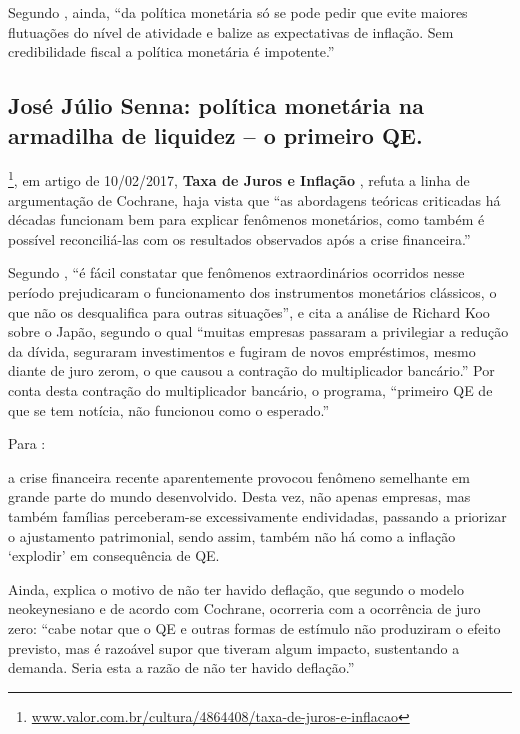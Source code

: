 \documentclass[
	10pt,				%
	openright,			%
	twoside,			%
	a5paper,			%
	english,			%
	french,				%
	spanish,			%
	brazil				%
	]{abntex2}
\renewenvironment{quote}
  {\small\list{}{\rightmargin=0.1cm \leftmargin=4cm}%
   \item\relax}
  {\endlist}
\begin{document}
Segundo , ainda, ``da política monetária só
se pode pedir que evite maiores flutuações do nível de atividade e
balize as expectativas de inflação. Sem credibilidade fiscal a política
monetária é impotente.''

\subsection{José Júlio Senna: política monetária na armadilha de
liquidez -- o primeiro
QE.}\label{josuxe9-juxfalio-senna-poluxedtica-monetuxe1ria-na-armadilha-de-liquidez-o-primeiro-qe.}

\footnote{\href{http://www.valor.com.br/cultura/4864408/taxa-de-juros-e-inflacao}{www.valor.com.br/cultura/4864408/taxa-de-juros-e-inflacao}},
em artigo de 10/02/2017, \textbf{Taxa de Juros e Inflação} \cite{senna},
refuta a linha de argumentação de Cochrane, haja vista que ``as
abordagens teóricas criticadas há décadas funcionam bem para explicar
fenômenos monetários, como também é possível reconciliá-las com os
resultados observados após a crise financeira.''

Segundo , ``é fácil constatar que fenômenos
extraordinários ocorridos nesse período prejudicaram o funcionamento dos
instrumentos monetários clássicos, o que não os desqualifica para outras
situações'', e cita a análise de Richard Koo sobre o Japão, segundo o
qual ``muitas empresas passaram a privilegiar a redução da dívida,
seguraram investimentos e fugiram de novos empréstimos, mesmo diante de
juro zerom, o que causou a contração do multiplicador bancário.'' Por
conta desta contração do multiplicador bancário, o programa, ``primeiro
QE de que se tem notícia, não funcionou como o esperado.''

Para :

\begin{quote}
a crise financeira recente aparentemente provocou fenômeno semelhante em
grande parte do mundo desenvolvido. Desta vez, não apenas empresas, mas
também famílias perceberam-se excessivamente endividadas, passando a
priorizar o ajustamento patrimonial, sendo assim, também não há como a
inflação `explodir' em consequência de QE.
\end{quote}

Ainda,  explica o motivo de não ter havido
deflação, que segundo o modelo neokeynesiano e de acordo com Cochrane,
ocorreria com a ocorrência de juro zero: ``cabe notar que o QE e outras
formas de estímulo não produziram o efeito previsto, mas é razoável
supor que tiveram algum impacto, sustentando a demanda. Seria esta a
razão de não ter havido deflação.''
\end{document}

